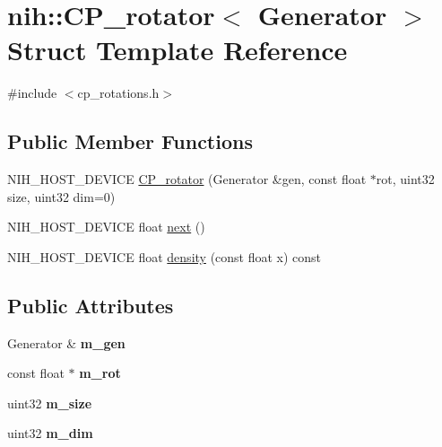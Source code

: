 \hypertarget{structnih_1_1_c_p__rotator}{
\section{nih\-:\-:\-C\-P\-\_\-rotator$<$ \-Generator $>$ \-Struct \-Template \-Reference}
\label{structnih_1_1_c_p__rotator}
}


{\ttfamily \#include $<$cp\-\_\-rotations.\-h$>$}

\subsection*{\-Public \-Member \-Functions}
\begin{DoxyCompactItemize}
\item 
\-N\-I\-H\-\_\-\-H\-O\-S\-T\-\_\-\-D\-E\-V\-I\-C\-E \hyperlink{structnih_1_1_c_p__rotator_a9868e43041aa07b1c8d435830aca854b}{\-C\-P\-\_\-rotator} (\-Generator \&gen, const float $\ast$rot, uint32 size, uint32 dim=0)
\item 
\-N\-I\-H\-\_\-\-H\-O\-S\-T\-\_\-\-D\-E\-V\-I\-C\-E float \hyperlink{structnih_1_1_c_p__rotator_a4572683851e705acd2063988100c2e01}{next} ()
\item 
\-N\-I\-H\-\_\-\-H\-O\-S\-T\-\_\-\-D\-E\-V\-I\-C\-E float \hyperlink{structnih_1_1_c_p__rotator_a4af1ac36b0cc5c16f880d3e43a7d0ebd}{density} (const float x) const 
\end{DoxyCompactItemize}
\subsection*{\-Public \-Attributes}
\begin{DoxyCompactItemize}
\item 
\hypertarget{structnih_1_1_c_p__rotator_ae847c9c7cd45c838b399cdccddfba8fe}{
\-Generator \& {\bfseries m\-\_\-gen}}
\label{structnih_1_1_c_p__rotator_ae847c9c7cd45c838b399cdccddfba8fe}

\item 
\hypertarget{structnih_1_1_c_p__rotator_a1434823508a10160d72b75f2fd45804f}{
const float $\ast$ {\bfseries m\-\_\-rot}}
\label{structnih_1_1_c_p__rotator_a1434823508a10160d72b75f2fd45804f}

\item 
\hypertarget{structnih_1_1_c_p__rotator_ae084e4f340c0c7b2b6428917e3646499}{
uint32 {\bfseries m\-\_\-size}}
\label{structnih_1_1_c_p__rotator_ae084e4f340c0c7b2b6428917e3646499}

\item 
\hypertarget{structnih_1_1_c_p__rotator_aedc63e891bb1c628a5dcdc07565dbdc8}{
uint32 {\bfseries m\-\_\-dim}}
\label{structnih_1_1_c_p__rotator_aedc63e891bb1c628a5dcdc07565dbdc8}

\end{DoxyCompactItemize}


